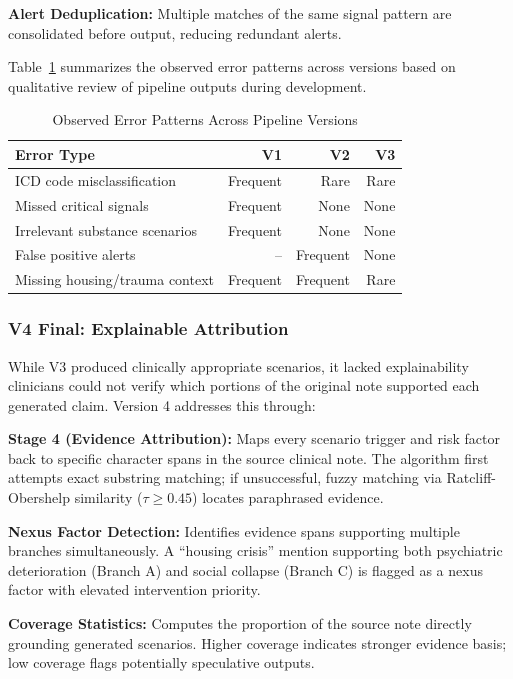 \documentclass[conference]{IEEEtran}
\begin{document}
\textbf{Alert Deduplication:} Multiple matches of the same signal pattern are consolidated before output, reducing redundant alerts.

Table~\ref{tab:version_comparison} summarizes the observed error patterns across versions based on qualitative review of pipeline outputs during development.

\begin{table}[h]
\caption{Observed Error Patterns Across Pipeline Versions}
\label{tab:version_comparison}
\centering
\begin{tabular}{@{}lrrr@{}}
\toprule
\textbf{Error Type} & \textbf{V1} & \textbf{V2} & \textbf{V3} \\
\midrule
ICD code misclassification & Frequent & Rare & Rare \\
Missed critical signals & Frequent & None & None \\
Irrelevant substance scenarios & Frequent & None & None \\
False positive alerts & -- & Frequent & None \\
Missing housing/trauma context & Frequent & Frequent & Rare \\
\bottomrule
\end{tabular}
\end{table}

\subsubsection{V4 Final: Explainable Attribution}

While V3 produced clinically appropriate scenarios, it lacked explainability clinicians could not verify which portions of the original note supported each generated claim. Version 4 addresses this through:

\textbf{Stage 4 (Evidence Attribution):} Maps every scenario trigger and risk factor back to specific character spans in the source clinical note. The algorithm first attempts exact substring matching; if unsuccessful, fuzzy matching via Ratcliff-Obershelp similarity ($\tau \geq 0.45$) locates paraphrased evidence.

\textbf{Nexus Factor Detection:} Identifies evidence spans supporting multiple branches simultaneously. A ``housing crisis'' mention supporting both psychiatric deterioration (Branch A) and social collapse (Branch C) is flagged as a nexus factor with elevated intervention priority.

\textbf{Coverage Statistics:} Computes the proportion of the source note directly grounding generated scenarios. Higher coverage indicates stronger evidence basis; low coverage flags potentially speculative outputs.
\end{document}
